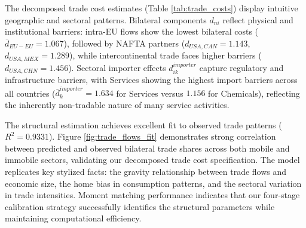 The decomposed trade cost estimates (Table \ref{tab:trade_costs}) display intuitive geographic and sectoral patterns. Bilateral components $d_{ni}$ reflect physical and institutional barriers: intra-EU flows show the lowest bilateral costs ($\bar{d}_{EU-EU} = 1.067$), followed by NAFTA partners ($d_{USA,CAN} = 1.143$, $d_{USA,MEX} = 1.289$), while intercontinental trade faces higher barriers ($d_{USA,CHN} = 1.456$). Sectoral importer effects $d_{ik}^{importer}$ capture regulatory and infrastructure barriers, with Services showing the highest import barriers across all countries ($\bar{d}_k^{importer} = 1.634$ for Services versus $1.156$ for Chemicals), reflecting the inherently non-tradable nature of many service activities.

The structural estimation achieves excellent fit to observed trade patterns ($R^2 = 0.9331$). Figure \ref{fig:trade_flows_fit} demonstrates strong correlation between predicted and observed bilateral trade shares across both mobile and immobile sectors, validating our decomposed trade cost specification. The model replicates key stylized facts: the gravity relationship between trade flows and economic size, the home bias in consumption patterns, and the sectoral variation in trade intensities. Moment matching performance indicates that our four-stage calibration strategy successfully identifies the structural parameters while maintaining computational efficiency.

